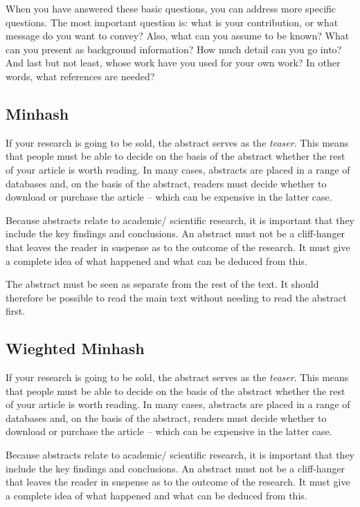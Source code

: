 When you have answered these basic questions, you can address more specific questions.
The most important question is: what is your contribution, or what message do you want to convey?
Also, what can you assume to be known? What can you present as background information? How much detail can you go into? And last but not least, whose work have you used for your own work? In other words, what references are needed?

\subsection{Minhash}\label{sec:_the_abstract}
If your research is going to be sold, the abstract serves as the \textit{teaser}.
This means that people must be able to decide on the basis of the abstract whether the rest of your article is worth reading.
In many cases, abstracts are placed in a range of databases and, on the basis of the abstract, readers must decide whether to download or purchase the article – which can be expensive in the latter case.

Because abstracts relate to academic/ scientific research, it is important that they include the key findings and conclusions.
An abstract must not be a cliff-hanger that leaves the reader in suspense as to the outcome of the research.
It must give a complete idea of what happened and what can be deduced from this.

The abstract must be seen as separate from the rest of the text.
It should therefore be possible to read the main text without needing to read the abstract first.

\subsection{Wieghted Minhash}\label{sec:_the_abstract}
If your research is going to be sold, the abstract serves as the \textit{teaser}.
This means that people must be able to decide on the basis of the abstract whether the rest of your article is worth reading.
In many cases, abstracts are placed in a range of databases and, on the basis of the abstract, readers must decide whether to download or purchase the article – which can be expensive in the latter case.

Because abstracts relate to academic/ scientific research, it is important that they include the key findings and conclusions.
An abstract must not be a cliff-hanger that leaves the reader in suspense as to the outcome of the research.
It must give a complete idea of what happened and what can be deduced from this.

